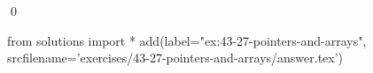 
\begin{ex}
  \label{ex:43-27-pointers-and-arrays}
  
  \qed
\end{ex}
\begin{python0}
from solutions import *
add(label="ex:43-27-pointers-and-arrays",
    srcfilename='exercises/43-27-pointers-and-arrays/answer.tex')
\end{python0}
